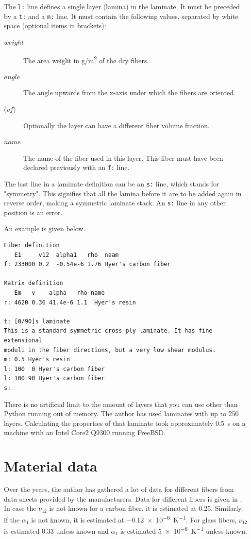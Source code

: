\documentclass[a4paper,landscape,oneside,11pt,twocolumn]{memoir}
\begin{document}
The \texttt{l:} line defines a single layer (lamina) in the laminate. It must be
preceded by a \texttt{t:} and a \texttt{m:} line. It must contain the following values,
separated by white space (optional items in brackets):
\begin{description}
    \item[$weight$] The area weight in \si{g/m^2} of the dry fibers.
    \item[$angle$] The angle upwards from the x-axis under which the fibers are oriented.
    \item[($vf$)] Optionally the layer can have a different fiber volume fraction.
    \item[$name$] The name of the fiber used in this layer. This fiber must have been
        declared previously with an \texttt{f:} line.
\end{description}

The last line in a laminate definition can be an \texttt{s:} line, which stands
for "symmetry". This signifies that all the lamina before it are to be added
again in reverse order, making a symmetric laminate stack. An \texttt{s:} line in any
other position is an error.

An example is given below.
\begin{lstlisting}[style=plain]
Fiber definition
   E1     v12  alpha1   rho  naam
f: 233000 0.2  -0.54e-6 1.76 Hyer's carbon fiber

Matrix definition
   Em   v    alpha   rho name
r: 4620 0.36 41.4e-6 1.1  Hyer's resin

t: [0/90]s laminate
This is a standard symmetric cross-ply laminate. It has fine extensional
moduli in the fiber directions, but a very low shear modulus.
m: 0.5 Hyer's resin
l: 100  0 Hyer's carbon fiber
l: 100 90 Hyer's carbon fiber
s:
\end{lstlisting}

There is no artificial limit to the amount of layers that you can use other
than Python running out of memory. The author has used laminates with up to
250 layers. Calculating the properties of that laminate took approximately
\SI{0.5}{s} on a machine with an Intel Core2 Q9300 running FreeBSD.

\section{Material data} %

Over the years, the author has gathered a lot of data for different fibers
from data sheets provided by the manufacturers. Data for different
fibers is given in . In case the $\nu_{12}$ is not
known for a carbon fiber, it is estimated at 0.25. Similarly, if the
$\alpha_1$ is not known, it is estimated at \SI{-0.12e-6}{K^{-1}}. For glass
fibers, $\nu_{12}$ is estimated 0.33 unless known and $\alpha_1$ is estimated
\SI{5e-6}{K^{-1}} unless known.
\end{document}
